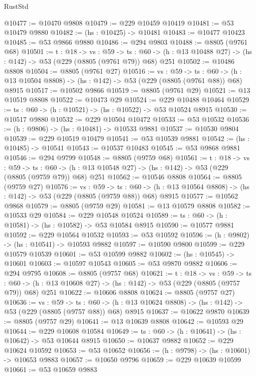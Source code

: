 \begin{lexlean}{RustStd}
\begin{coremodule}
@10477 := @10470 @9808
@10479 := @229 @10459 @10419
@10481 := @53 @10479 @9880
@10482 := (hs : @10425) -> @10481
@10483 := @10477 @10423
@10485 := @53 @9866 @9880
@10486 := @294 @9803
@10488 := @8805 (@9761 @68)
@10501 := {t : @18} ->
  {vs : @59} ->
  {ts : @60} -> (h : @13 @10488 @27) -> (hs : @142) -> @53 (@229 (@8805 (@9761 @79)) @68) @251
@10502 := @10486 @8808
@10504 := @8805 (@9761 @27)
@10516 := {vs : @59} ->
  {ts : @60} -> (h : @13 @10504 @8808) -> (hs : @142) -> @53 (@229 (@8805 (@9761 @88)) @68) @8915
@10517 := @10502 @9866
@10519 := @8805 (@9761 @29)
@10521 := @13 @10519 @8808
@10522 := @10473 @29
@10524 := @229 @10488 @10464
@10529 := {ts : @60} -> (h : @10521) -> (hs : @10522) -> @53 @10524 @8915
@10530 := @10517 @9880
@10532 := @229 @10504 @10472
@10533 := @53 @10532
@10536 := (h : @9806) -> (hs : @10481) -> @10533 @9881
@10537 := @10530 @9804
@10539 := @229 @10519 @10479
@10541 := @53 @10539 @9881
@10542 := (hs : @10485) -> @10541
@10543 := @10537 @10483
@10545 := @53 @9868 @9881
@10546 := @294 @9799
@10548 := @8805 (@9759 @68)
@10561 := {t : @18} ->
  {vs : @59} ->
  {ts : @60} -> (h : @13 @10548 @27) -> (hs : @142) -> @53 (@229 (@8805 (@9759 @79)) @68) @251
@10562 := @10546 @8808
@10564 := @8805 (@9759 @27)
@10576 := {vs : @59} ->
  {ts : @60} -> (h : @13 @10564 @8808) -> (hs : @142) -> @53 (@229 (@8805 (@9759 @88)) @68) @8915
@10577 := @10562 @9868
@10579 := @8805 (@9759 @29)
@10581 := @13 @10579 @8808
@10582 := @10533 @29
@10584 := @229 @10548 @10524
@10589 := {ts : @60} -> (h : @10581) -> (hs : @10582) -> @53 @10584 @8915
@10590 := @10577 @9881
@10592 := @229 @10564 @10532
@10593 := @53 @10592
@10596 := (h : @9802) -> (hs : @10541) -> @10593 @9882
@10597 := @10590 @9800
@10599 := @229 @10579 @10539
@10601 := @53 @10599 @9882
@10602 := (hs : @10545) -> @10601
@10603 := @10597 @10543
@10605 := @53 @9870 @9882
@10606 := @294 @9795
@10608 := @8805 (@9757 @68)
@10621 := {t : @18} ->
  {vs : @59} ->
  {ts : @60} -> (h : @13 @10608 @27) -> (hs : @142) -> @53 (@229 (@8805 (@9757 @79)) @68) @251
@10622 := @10606 @8808
@10624 := @8805 (@9757 @27)
@10636 := {vs : @59} ->
  {ts : @60} -> (h : @13 @10624 @8808) -> (hs : @142) -> @53 (@229 (@8805 (@9757 @88)) @68) @8915
@10637 := @10622 @9870
@10639 := @8805 (@9757 @29)
@10641 := @13 @10639 @8808
@10642 := @10593 @29
@10644 := @229 @10608 @10584
@10649 := {ts : @60} -> (h : @10641) -> (hs : @10642) -> @53 @10644 @8915
@10650 := @10637 @9882
@10652 := @229 @10624 @10592
@10653 := @53 @10652
@10656 := (h : @9798) -> (hs : @10601) -> @10653 @9883
@10657 := @10650 @9796
@10659 := @229 @10639 @10599
@10661 := @53 @10659 @9883

\end{coremodule}
\end{lexlean}
